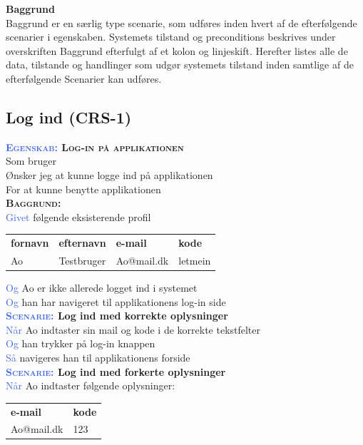 \large{\textbf{Baggrund}}\\
Baggrund er en særlig type scenarie, som udføres inden hvert af de 
efterfølgende scenarier	i egenskaben. Systemets tilstand og preconditions 
beskrives under overskriften Baggrund efterfulgt af et kolon og 
linjeskift. Herefter listes alle de data, tilstande og handlinger som udgør 
systemets tilstand inden samtlige af de efterfølgende Scenarier kan	udføres.


\subsection{Log ind (CRS-1)} \label{sec:USLogInd}
\textbf{\textsc{\textcolor{RoyalBlue} {Egenskab:} Log-in på applikationen}} \\
Som bruger\\
Ønsker jeg at kunne logge ind på applikationen\\
For at kunne benytte applikationen\\

\textbf{\textsc{\color{RoyalBlue}Baggrund:}}\\
\textcolor{RoyalBlue}{Givet} følgende eksisterende profil\\
\begin{tabular}{| l | l | l | l |}
	\textbf{fornavn} & \textbf{efternavn} & \textbf{e-mail} & \textbf{kode} \\
	Ao & Testbruger & Ao@mail.dk & letmein\\
\end{tabular}
\newline \newline
\textcolor{RoyalBlue}{Og} Ao er ikke allerede logget ind i systemet\\
\textcolor{RoyalBlue}{Og} han har navigeret til applikationens log-in side\\

\textbf{\textsc{\textcolor{RoyalBlue}{Scenarie:}} Log ind med korrekte oplysninger}\\
\textcolor{RoyalBlue}{Når} Ao indtaster sin mail og kode i de korrekte tekstfelter\\
\textcolor{RoyalBlue}{Og} han trykker på log-in knappen\\
\textcolor{RoyalBlue}{Så} navigeres han til applikationens forside\\

\textbf{\textsc{\textcolor{RoyalBlue}{Scenarie:}} Log ind med forkerte oplysninger} \\
\textcolor{RoyalBlue}{Når} Ao indtaster følgende oplysninger:\\
\begin{tabular}{| l | l |}
	\textbf{e-mail} & \textbf{kode}\\
	Ao@mail.dk & 123\\
\end{tabular}



